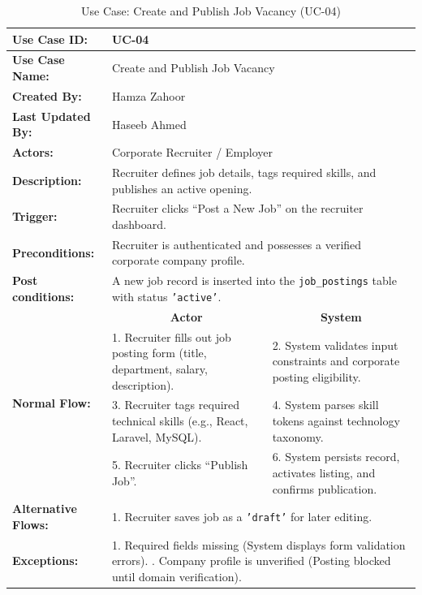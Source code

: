 \begin{table}[H]
\centering
\small
\caption{Use Case: Create and Publish Job Vacancy (UC-04)}
\label{tab:uc04_spec}
\begin{tabular}{|p{3.2cm}|p{5.5cm}|p{5.5cm}|}
\hline
\textbf{Use Case ID:} & \multicolumn{2}{p{11.4cm}|}{UC-04} \\ \hline
\textbf{Use Case Name:} & \multicolumn{2}{p{11.4cm}|}{Create and Publish Job Vacancy} \\ \hline
\textbf{Created By:} & \multicolumn{2}{p{11.4cm}|}{Hamza Zahoor} \\ \hline
\textbf{Last Updated By:} & \multicolumn{2}{p{11.4cm}|}{Haseeb Ahmed} \\ \hline
\textbf{Actors:} & \multicolumn{2}{p{11.4cm}|}{Corporate Recruiter / Employer} \\ \hline
\textbf{Description:} & \multicolumn{2}{p{11.4cm}|}{Recruiter defines job details, tags required skills, and publishes an active opening.} \\ \hline
\textbf{Trigger:} & \multicolumn{2}{p{11.4cm}|}{Recruiter clicks ``Post a New Job'' on the recruiter dashboard.} \\ \hline
\textbf{Preconditions:} & \multicolumn{2}{p{11.4cm}|}{Recruiter is authenticated and possesses a verified corporate company profile.} \\ \hline
\textbf{Post conditions:} & \multicolumn{2}{p{11.4cm}|}{A new job record is inserted into the \texttt{job\_postings} table with status \texttt{'active'}.} \\ \hline
\multirow{4}{*}{\textbf{Normal Flow:}} & \multicolumn{1}{c|}{\textbf{Actor}} & \multicolumn{1}{c|}{\textbf{System}} \\ \cline{2-3}
& 1. Recruiter fills out job posting form (title, department, salary, description). & 2. System validates input constraints and corporate posting eligibility. \vspace{2pt} \\
& 3. Recruiter tags required technical skills (e.g., React, Laravel, MySQL). & 4. System parses skill tokens against technology taxonomy. \vspace{2pt} \\
& 5. Recruiter clicks ``Publish Job''. & 6. System persists record, activates listing, and confirms publication. \\ \hline
\textbf{Alternative Flows:} & \multicolumn{2}{p{11.4cm}|}{1. Recruiter saves job as a \texttt{'draft'} for later editing.} \\ \hline
\textbf{Exceptions:} & \multicolumn{2}{p{11.4cm}|}{1. Required fields missing (System displays form validation errors). \newline 2. Company profile is unverified (Posting blocked until domain verification).} \\ \hline
\end{tabular}
\end{table}

